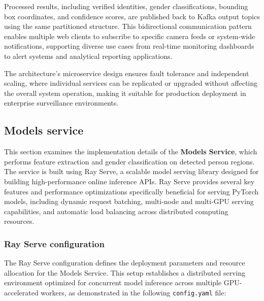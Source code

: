 Processed results, including verified identities, gender classifications, bounding box coordinates, and confidence scores, are published back to Kafka output topics using the same partitioned structure. This bidirectional communication pattern enables multiple web clients to subscribe to specific camera feeds or system-wide notifications, supporting diverse use cases from real-time monitoring dashboards to alert systems and analytical reporting applications.

The architecture's microservice design ensures fault tolerance and independent scaling, where individual services can be replicated or upgraded without affecting the overall system operation, making it suitable for production deployment in enterprise surveillance environments.


\subsection{Models service}

This section examines the implementation details of the \textbf{Models Service}, which performs feature extraction and gender classification on detected person regions. The service is built using Ray Serve, a scalable model serving library designed for building high-performance online inference APIs. Ray Serve provides several key features and performance optimizations specifically beneficial for serving PyTorch models, including dynamic request batching, multi-node and multi-GPU serving capabilities, and automatic load balancing across distributed computing resources.

\subsubsection{Ray Serve configuration}

The Ray Serve configuration defines the deployment parameters and resource allocation for the Models Service. This setup establishes a distributed serving environment optimized for concurrent model inference across multiple GPU-accelerated workers, as demonstrated in the following \texttt{config.yaml} file:

